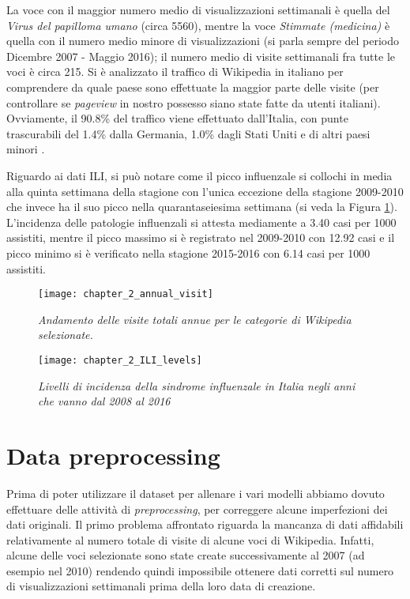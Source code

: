 La voce con il maggior numero medio di visualizzazioni settimanali è quella del \textit{Virus del papilloma umano} (circa 
5560), mentre la voce \textit{Stimmate (medicina)} è quella con il numero medio minore di visualizzazioni (si parla sempre 
del periodo Dicembre 2007 - Maggio 2016); il numero medio di visite settimanali fra tutte le voci è circa 215. 
Si è analizzato il traffico di Wikipedia in italiano per comprendere da quale paese sono effettuate la maggior parte 
delle visite (per controllare se \textit{pageview} in nostro possesso siano state fatte da utenti italiani). 
Ovviamente, il 90.8\% del traffico viene effettuato dall'Italia, con punte trascurabili del 1.4\% dalla Germania, 1.0\% dagli 
Stati Uniti e di altri paesi minori \cite{WikipediaStatsCountry}.
\bigskip

Riguardo ai dati ILI, si può notare come il picco influenzale si collochi in media alla quinta settimana della stagione con 
l'unica eccezione della stagione 2009-2010 che invece ha il suo picco nella quarantaseiesima settimana (si veda la 
Figura \ref{fig:ch_2_ILI_levels}). L'incidenza delle patologie influenzali si attesta mediamente a 3.40 casi per 1000 
assistiti, mentre il picco massimo si è registrato nel 2009-2010 con 12.92 casi e il picco minimo si è verificato nella 
stagione 2015-2016 con 6.14 casi per 1000 assistiti.
\bigskip

\begin{figure}[h!]

\texttt{[image: chapter\_2\_annual\_visit]}
\caption{\textit{Andamento delle visite totali annue per le categorie di Wikipedia selezionate.}}
\label{fig:ch_2_annual_visit}


\texttt{[image: chapter\_2\_ILI\_levels]}
\caption{\textit{Livelli di incidenza della sindrome influenzale in Italia negli anni che vanno dal 2008 al 2016}}
\label{fig:ch_2_ILI_levels}

\centering

\end{figure}
\bigskip

\section{Data preprocessing}
\bigskip

Prima di poter utilizzare il dataset per allenare i vari modelli abbiamo dovuto effettuare delle attività di 
\textit{preprocessing}, per correggere alcune imperfezioni dei dati originali. Il primo problema affrontato riguarda la mancanza di dati affidabili relativamente al numero totale di visite di alcune voci di Wikipedia.
Infatti, alcune delle voci selezionate sono state create successivamente al 2007 (ad esempio nel 2010) rendendo quindi 
impossibile ottenere dati corretti sul numero di visualizzazioni settimanali prima della loro data di creazione. 
\bigskip

